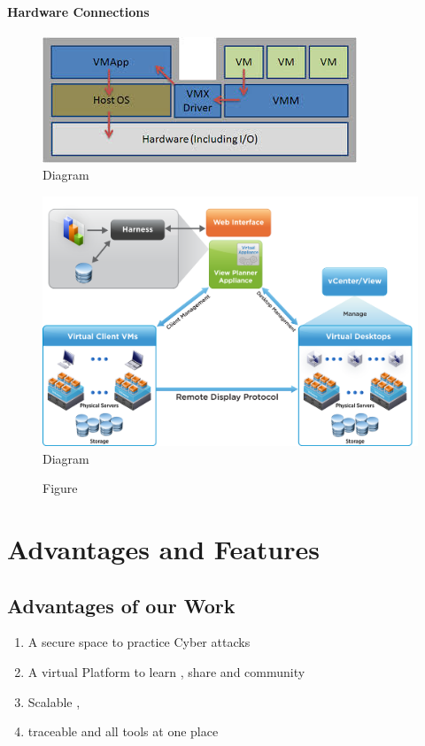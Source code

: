 \documentclass[12pt,a4paper,final,oneside]{report}
\begin{document}
\subsubsection{Hardware Connections}
\noindent\begin{figure}[h!]
		\centering
		\includegraphics[width=0.685\linewidth,angle=0]{vm.jpg}
		\caption{Diagram }
	\end{figure}
\noindent\begin{figure}[h!]
		\centering
		\includegraphics[width=0.685\linewidth,angle=0]{v.png}
		\caption{Diagram }
	\end{figure}	
	\noindent\begin{figure}[h!]
		\centering
		\caption{Figure }
	\end{figure}
\newpage
\chapter{Advantages and Features}
\section{Advantages of our Work}
\begin{enumerate}
\item A secure space to practice Cyber attacks
\item A virtual Platform to learn , share and community
\item Scalable , 
\item traceable and all tools at one place
\end{enumerate}
\end{document}
